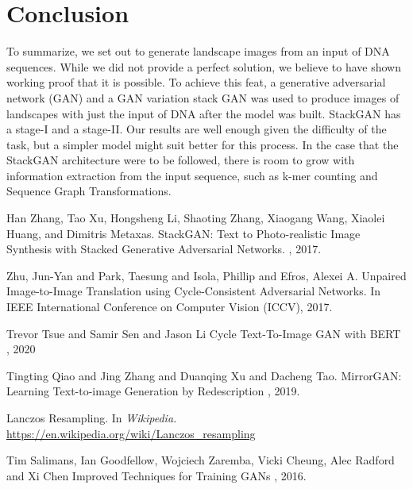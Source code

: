\documentclass{article}
\begin{document}
	\section{Conclusion}

	 To summarize, we set out to generate landscape images from an input of DNA sequences. While we did not provide a perfect solution, we believe to have shown working proof that it is possible. To achieve this feat, a generative adversarial network (GAN) and a GAN variation stack GAN was used to produce images of landscapes with just the input of DNA after the model was built. StackGAN has a stage-I and a stage-II. Our results are well enough given the difficulty of the task, but a simpler model might suit better for this process. In the case that the StackGAN architecture were to be followed, there is room to grow with information extraction from the input sequence, such as k-mer counting and Sequence Graph Transformations.


	  
	\begin{thebibliography}{1}
		Han Zhang, Tao Xu, Hongsheng Li, Shaoting Zhang, Xiaogang Wang, Xiaolei Huang, and 
		Dimitris Metaxas.
		\newblock StackGAN: Text to Photo-realistic Image Synthesis with Stacked 
		Generative Adversarial Networks.
		, 2017.
		

		Zhu, Jun-Yan and Park, Taesung and Isola, Phillip and Efros, Alexei A.
		\newblock Unpaired Image-to-Image Translation using Cycle-Consistent Adversarial Networks.
		\newblock In IEEE International Conference on Computer Vision (ICCV), 2017.

		Trevor Tsue and Samir Sen and Jason Li
		\newblock Cycle Text-To-Image GAN with BERT
		, 2020
		
		Tingting Qiao and Jing Zhang and Duanqing Xu and Dacheng Tao.
		\newblock MirrorGAN: Learning Text-to-image Generation by Redescription
		, 2019.

		Lanczos Resampling.
		\newblock In {\em Wikipedia.} \url{https://en.wikipedia.org/wiki/Lanczos_resampling}
		
		Tim Salimans, Ian Goodfellow, Wojciech Zaremba, Vicki Cheung, Alec Radford and Xi Chen
		\newblock Improved Techniques for Training GANs
		, 2016.

	\end{thebibliography}
	
\end{document}
